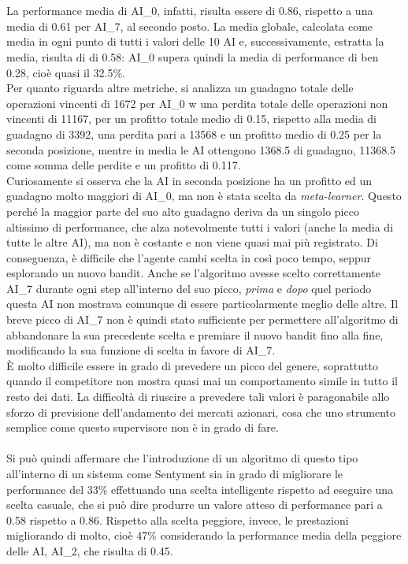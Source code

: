 \documentclass[a4paper,12pt]{report}
\begin{document}
\begin{fig}
\\~\\La performance media di AI\_0, infatti, risulta essere di 0.86, rispetto a una media di 0.61 per AI\_7, al secondo posto. La media globale, calcolata come media in ogni punto di tutti i valori delle 10 AI e, successivamente, estratta la media, risulta di di 0.58: AI\_0 supera quindi la media di performance di ben 0.28, cioè quasi il 32.5\%.\\Per quanto riguarda altre metriche, si analizza un guadagno totale delle operazioni vincenti di 1672 per AI\_0 w una perdita totale delle operazioni non vincenti di 11167, per un profitto totale medio di 0.15, rispetto alla media di guadagno di 3392, una perdita pari a 13568 e un profitto medio di 0.25 per la seconda posizione, mentre in media le AI ottengono 1368.5 di guadagno, 11368.5 come somma delle perdite e un profitto di 0.117.\\ Curiosamente si osserva che la AI in seconda posizione ha un profitto ed un guadagno molto maggiori di AI\_0, ma non è stata scelta da \textit{meta-learner}. Questo perché la maggior parte del suo alto guadagno deriva da un singolo picco altissimo di performance, che alza notevolmente tutti i valori (anche la media di tutte le altre AI), ma non è costante e non viene quasi mai più registrato. Di conseguenza, è difficile che l'agente cambi scelta in così poco tempo, seppur esplorando un nuovo bandit. Anche se l'algoritmo avesse scelto correttamente AI\_7 durante ogni step all'interno del suo picco, \textit{prima} e \textit{dopo} quel periodo questa AI non mostrava comunque di essere particolarmente meglio delle altre. Il breve picco di AI\_7 non è quindi stato sufficiente per permettere all'algoritmo di abbandonare la sua precedente scelta e premiare il nuovo bandit fino alla fine, modificando la sua funzione di scelta in favore di AI\_7.\\È molto difficile essere in grado di prevedere un picco del genere, soprattutto quando il competitore non mostra quasi mai un comportamento simile in tutto il resto dei dati. La difficoltà di riuscire a prevedere tali valori è paragonabile allo sforzo di previsione dell'andamento dei mercati azionari, cosa che uno strumento semplice come questo supervisore non è in grado di fare.
\\~\\ Si può quindi affermare che l'introduzione di un algoritmo di questo tipo all'interno di un sistema come Sentyment sia in grado di migliorare le performance del 33\% effettuando una scelta intelligente rispetto ad eseguire una scelta casuale, che si può dire produrre un valore atteso di performance pari a 0.58 rispetto a 0.86. Rispetto alla scelta peggiore, invece, le prestazioni migliorando di molto, cioè 47\% considerando la performance media della peggiore delle AI, AI\_2, che risulta di 0.45.


\end{fig}
\end{document}
